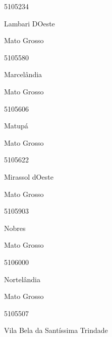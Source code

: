 \documentclass[
  letterpaper,
]{report}
\begin{document}
5105234

\n      

Lambari D\textquotesingle Oeste

\n    

\n    

\n      

Mato Grosso

\n      

5105580

\n      

Marcelândia

\n    

\n    

\n      

Mato Grosso

\n      

5105606

\n      

Matupá

\n    

\n    

\n      

Mato Grosso

\n      

5105622

\n      

Mirassol d\textquotesingle Oeste

\n    

\n    

\n      

Mato Grosso

\n      

5105903

\n      

Nobres

\n    

\n    

\n      

Mato Grosso

\n      

5106000

\n      

Nortelândia

\n    

\n    

\n      

Mato Grosso

\n      

5105507

\n      

Vila Bela da Santíssima Trindade
\end{document}
